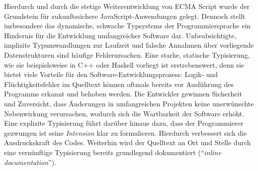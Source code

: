Hierdurch und durch die stetige Weiterentwicklung von ECMA Script wurde der Grundstein für zukunftssichere JavaScript-Anwendungen gelegt. Dennoch stellt insbesondere das dynamische, schwache Typsystems der Programmiersprache ein Hindernis für die Entwicklung umfangreicher Software dar. Unbeabsichtigte, implizite Typumwandlungen zur Laufzeit und falsche Annahmen über vorliegende Datenstrukturen sind häufige Fehlerursachen. Eine starke, statische Typisierung, wie sie beispielsweise in C++ oder Haskell vorliegt ist erstrebenswert, denn sie bietet viele Vorteile für den Software-Entwicklungsprozess: Logik- und Flüchtigkeitsfehler im Quelltext können oftmals bereits vor Ausführung des Programms erkannt und behoben werden. Die Entwickler gewinnen Sicherheit und Zuversicht, dass Änderungen in umfangreichen Projekten keine unerwünschte Nebenwirkung verursachen, wodurch sich die Wartbarkeit der Software erhöht. Eine explizite Typisierung führt darüber hinaus dazu, dass der Programmierer gezwungen ist seine \emph{Intension} klar zu formulieren. Hierdurch verbessert sich die Ausdruckskraft des Codes. Weiterhin wird der Quelltext an Ort und Stelle durch eine vernünftige Typisierung bereits grundlegend dokumentiert (\enquote{\emph{inline documentation}}).

